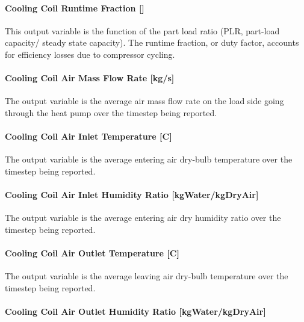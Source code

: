 \paragraph{\texorpdfstring{Cooling Coil Runtime Fraction {[]}}{Cooling Coil Runtime Fraction }}\label{cooling-coil-runtime-fraction-3}

This output variable is the function of the part load ratio (PLR, part-load capacity/ steady state capacity). The runtime fraction, or duty factor, accounts for efficiency losses due to compressor cycling.

\paragraph{Cooling Coil Air Mass Flow Rate {[}kg/s{]}}\label{cooling-coil-air-mass-flow-rate-kgs}

The output variable is the average air mass flow rate on the load side going through the heat pump over the timestep being reported.

\paragraph{Cooling Coil Air Inlet Temperature {[}C{]}}\label{cooling-coil-air-inlet-temperature-c}

The output variable is the average entering air dry-bulb temperature over the timestep being reported.

\paragraph{Cooling Coil Air Inlet Humidity Ratio {[}kgWater/kgDryAir{]}}\label{cooling-coil-air-inlet-humidity-ratio-kgwaterkgdryair}

The output variable is the average entering air dry humidity ratio over the timestep being reported.

\paragraph{Cooling Coil Air Outlet Temperature {[}C{]}}\label{cooling-coil-air-outlet-temperature-c}

The output variable is the average leaving air dry-bulb temperature over the timestep being reported.

\paragraph{Cooling Coil Air Outlet Humidity Ratio {[}kgWater/kgDryAir{]}}\label{cooling-coil-air-outlet-humidity-ratio-kgwaterkgdryair}

